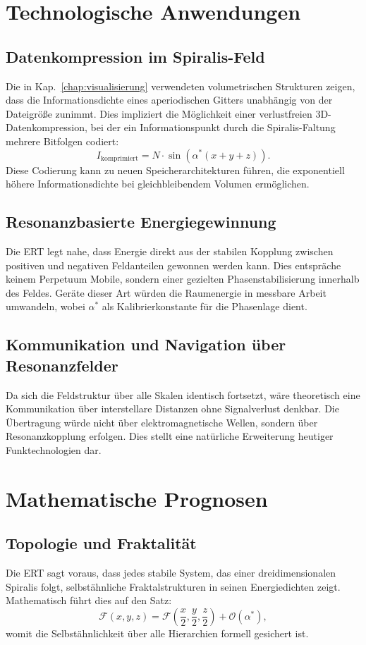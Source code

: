 \section{Technologische Anwendungen}
\label{sec:technologie}
\subsection{Datenkompression im Spiralis-Feld}
Die in Kap.~\ref{chap:visualisierung} verwendeten volumetrischen Strukturen zeigen, 
dass die Informationsdichte eines aperiodischen Gitters unabhängig von der Dateigröße zunimmt. 
Dies impliziert die Möglichkeit einer verlustfreien 3D-Datenkompression, 
bei der ein Informationspunkt durch die Spiralis-Faltung mehrere Bitfolgen codiert:
\[
I_\text{komprimiert} = N \cdot \sin(\alpha^* (x+y+z)).
\]
Diese Codierung kann zu neuen Speicherarchitekturen führen, 
die exponentiell höhere Informationsdichte bei gleichbleibendem Volumen ermöglichen.

\subsection{Resonanzbasierte Energiegewinnung}
Die ERT legt nahe, dass Energie direkt aus der stabilen Kopplung zwischen positiven und negativen Feldanteilen gewonnen werden kann. 
Dies entspräche keinem Perpetuum Mobile, sondern einer gezielten Phasenstabilisierung innerhalb des Feldes. 
Geräte dieser Art würden die Raumenergie in messbare Arbeit umwandeln, 
wobei \(\alpha^*\) als Kalibrierkonstante für die Phasenlage dient.

\subsection{Kommunikation und Navigation über Resonanzfelder}
Da sich die Feldstruktur über alle Skalen identisch fortsetzt, 
wäre theoretisch eine Kommunikation über interstellare Distanzen ohne Signalverlust denkbar. 
Die Übertragung würde nicht über elektromagnetische Wellen, sondern über Resonanzkopplung erfolgen. 
Dies stellt eine natürliche Erweiterung heutiger Funktechnologien dar.

\section{Mathematische Prognosen}
\label{sec:mathematisch}
\subsection{Topologie und Fraktalität}
Die ERT sagt voraus, dass jedes stabile System, das einer dreidimensionalen Spiralis folgt, 
selbstähnliche Fraktalstrukturen in seinen Energiedichten zeigt. 
Mathematisch führt dies auf den Satz:
\[
\mathcal{F}(x,y,z) = \mathcal{F}\left(\frac{x}{2},\frac{y}{2},\frac{z}{2}\right) + \mathcal{O}(\alpha^*),
\]
womit die Selbstähnlichkeit über alle Hierarchien formell gesichert ist.

